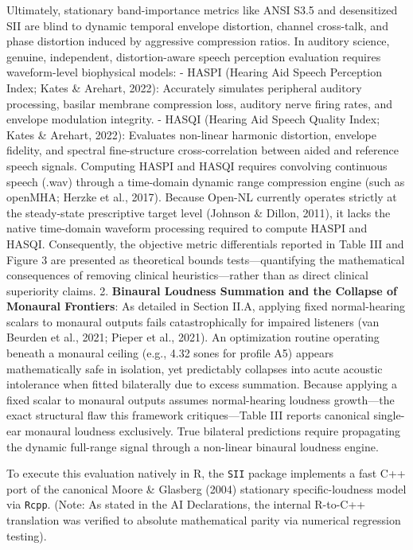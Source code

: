 \documentclass[
  12pt,
]{article}
\begin{document}
Ultimately, stationary band-importance metrics like ANSI S3.5 and
desensitized SII are blind to dynamic temporal envelope distortion,
channel cross-talk, and phase distortion induced by aggressive
compression ratios. In auditory science, genuine, independent,
distortion-aware speech perception evaluation requires waveform-level
biophysical models: - HASPI (Hearing Aid Speech Perception Index; Kates
\& Arehart, 2022): Accurately simulates peripheral auditory processing,
basilar membrane compression loss, auditory nerve firing rates, and
envelope modulation integrity. - HASQI (Hearing Aid Speech Quality
Index; Kates \& Arehart, 2022): Evaluates non-linear harmonic
distortion, envelope fidelity, and spectral fine-structure
cross-correlation between aided and reference speech signals. Computing
HASPI and HASQI requires convolving continuous speech (.wav) through a
time-domain dynamic range compression engine (such as openMHA; Herzke et
al., 2017). Because Open-NL currently operates strictly at the
steady-state prescriptive target level (Johnson \& Dillon, 2011), it
lacks the native time-domain waveform processing required to compute
HASPI and HASQI. Consequently, the objective metric differentials
reported in Table III and Figure 3 are presented as theoretical bounds
tests---quantifying the mathematical consequences of removing clinical
heuristics---rather than as direct clinical superiority claims. 2.
\textbf{Binaural Loudness Summation and the Collapse of Monaural
Frontiers}: As detailed in Section II.A, applying fixed normal-hearing
scalars to monaural outputs fails catastrophically for impaired
listeners (van Beurden et al., 2021; Pieper et al., 2021). An
optimization routine operating beneath a monaural ceiling (e.g., 4.32
sones for profile A5) appears mathematically safe in isolation, yet
predictably collapses into acute acoustic intolerance when fitted
bilaterally due to excess summation. Because applying a fixed scalar to
monaural outputs assumes normal-hearing loudness growth---the exact
structural flaw this framework critiques---Table III reports canonical
single-ear monaural loudness exclusively. True bilateral predictions
require propagating the dynamic full-range signal through a non-linear
binaural loudness engine.

To execute this evaluation natively in R, the \texttt{SII} package
implements a fast C++ port of the canonical Moore \& Glasberg (2004)
stationary specific-loudness model via \texttt{Rcpp}. (Note: As stated
in the AI Declarations, the internal R-to-C++ translation was verified
to absolute mathematical parity via numerical regression testing).
\end{document}
